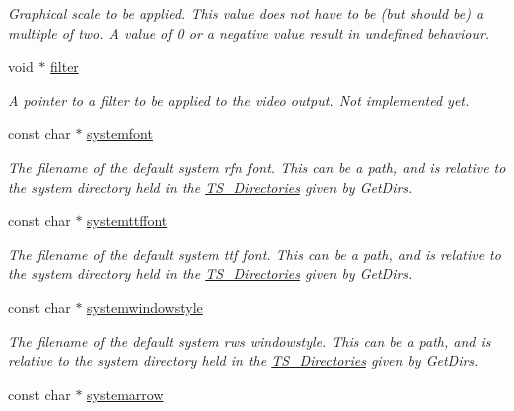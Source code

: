 \begin{DoxyCompactItemize}
\begin{DoxyCompactList}\small\item\em Graphical scale to be applied. This value does not have to be (but should be) a multiple of two. A value of 0 or a negative value result in undefined behaviour. \end{DoxyCompactList}\item 
\hypertarget{structTS__Config_a32098e8e8e2826aba059314aa6fafa51}{void $\ast$ \hyperlink{structTS__Config_a32098e8e8e2826aba059314aa6fafa51}{filter}}\label{structTS__Config_a32098e8e8e2826aba059314aa6fafa51}

\begin{DoxyCompactList}\small\item\em A pointer to a filter to be applied to the video output. Not implemented yet. \end{DoxyCompactList}\item 
\hypertarget{structTS__Config_a1ebf70f0eb5fe1bb6fc394723951337e}{const char $\ast$ \hyperlink{structTS__Config_a1ebf70f0eb5fe1bb6fc394723951337e}{systemfont}}\label{structTS__Config_a1ebf70f0eb5fe1bb6fc394723951337e}

\begin{DoxyCompactList}\small\item\em The filename of the default system rfn font. This can be a path, and is relative to the system directory held in the \hyperlink{structTS__Directories}{T\-S\-\_\-\-Directories} given by Get\-Dirs. \end{DoxyCompactList}\item 
\hypertarget{structTS__Config_a5e29e9ed68626e6db12a1bd5ef26b9d3}{const char $\ast$ \hyperlink{structTS__Config_a5e29e9ed68626e6db12a1bd5ef26b9d3}{systemttffont}}\label{structTS__Config_a5e29e9ed68626e6db12a1bd5ef26b9d3}

\begin{DoxyCompactList}\small\item\em The filename of the default system ttf font. This can be a path, and is relative to the system directory held in the \hyperlink{structTS__Directories}{T\-S\-\_\-\-Directories} given by Get\-Dirs. \end{DoxyCompactList}\item 
\hypertarget{structTS__Config_adcfe71340a9c43a2ef75d19848782ab6}{const char $\ast$ \hyperlink{structTS__Config_adcfe71340a9c43a2ef75d19848782ab6}{systemwindowstyle}}\label{structTS__Config_adcfe71340a9c43a2ef75d19848782ab6}

\begin{DoxyCompactList}\small\item\em The filename of the default system rws windowstyle. This can be a path, and is relative to the system directory held in the \hyperlink{structTS__Directories}{T\-S\-\_\-\-Directories} given by Get\-Dirs. \end{DoxyCompactList}\item 
\hypertarget{structTS__Config_a9ebc654ad70d92bb20c3109777d1fdd4}{const char $\ast$ \hyperlink{structTS__Config_a9ebc654ad70d92bb20c3109777d1fdd4}{systemarrow}}\label{structTS__Config_a9ebc654ad70d92bb20c3109777d1fdd4}


\end{DoxyCompactItemize}
